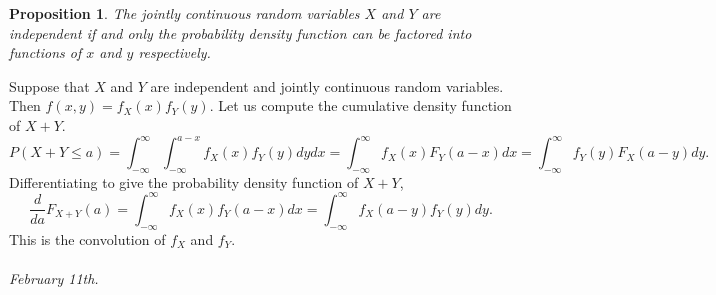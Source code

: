\documentclass[15pt,a4paper]{book}
\newtheorem{proposition}[theorem]{Proposition}
\theoremstyle{definition}
\begin{document}
\begin{proposition}
    The jointly continuous random variables $X$ and $Y$ are independent if and only the probability density function can be factored into functions of $x$ and $y$ respectively.
\end{proposition}

Suppose that $X$ and $Y$ are independent and jointly continuous random variables. Then $f(x,y) = f_{X}(x) f_{Y}(y)$. Let us compute the cumulative density function of $X+Y$.
\begin{equation}
    P(X+Y \leq a) = \int_{-\infty}^{\infty} \int_{-\infty}^{a-x} f_{X}(x) f_{Y}(y) dydx = \int_{-\infty}^{\infty} f_{X}(x) F_{Y}(a-x) dx = \int_{-\infty}^{\infty} f_{Y}(y) F_{X}(a-y) dy.
\end{equation}
Differentiating to give the probability density function of $X+Y$,
\begin{equation}
    \frac{d}{da} F_{X+Y}(a) = \int_{-\infty}^{\infty} f_{X}(x) f_{Y}(a-x) dx = \int_{-\infty}^{\infty} f_{X}(a-y) f_{Y}(y) dy.
\end{equation}
This is the convolution of $f_{X}$ and $f_{Y}$.\\ \\
\textit{February 11th.}
\end{document}
